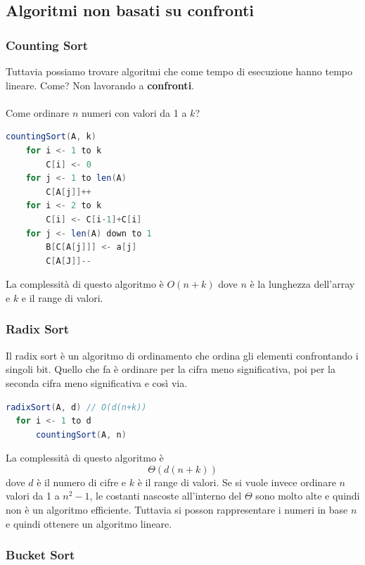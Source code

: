 \documentclass[a4paper]{article}
\begin{document}
\subsection{Algoritmi non basati su confronti}

\subsubsection{Counting Sort}
Tuttavia possiamo trovare algoritmi che come tempo 
di esecuzione hanno tempo lineare. Come? 
Non lavorando a \textbf{confronti}. 
\\\\
Come ordinare $n$ numeri con valori da 1 a $k$?
\begin{lstlisting}[language=Scala]
countingSort(A, k)
    for i <- 1 to k 
        C[i] <- 0
    for j <- 1 to len(A)
        C[A[j]]++
    for i <- 2 to k
        C[i] <- C[i-1]+C[i]
    for j <- len(A) down to 1
        B[C[A[j]]] <- a[j]
        C[A[J]]--
\end{lstlisting}
La complessità di questo algoritmo è $O(n + k)$ dove $n$ è la lunghezza dell'array e $k$ e il range di valori.

\subsubsection{Radix Sort}

Il radix sort è un algoritmo di ordinamento che ordina gli elementi 
confrontando i singoli bit. Quello che fa è ordinare per la cifra meno
significativa, poi per la seconda cifra meno significativa e così via.


\begin{lstlisting}[language=Scala]
radixSort(A, d) // O(d(n+k))
  for i <- 1 to d
      countingSort(A, n)
\end{lstlisting}
La complessità di questo algoritmo è \[\Theta(d(n+k))\]dove $d$ è il numero di cifre e $k$ è il range di valori.
Se si vuole invece ordinare $n$ valori da 1 a $n^2 - 1$, le costanti nascoste all'interno
del $\Theta$ sono molto alte e quindi non è un algoritmo efficiente. Tuttavia
si posson rappresentare i numeri in base $n$ e quindi ottenere un algoritmo lineare.

\subsubsection{Bucket Sort}
\end{document}
